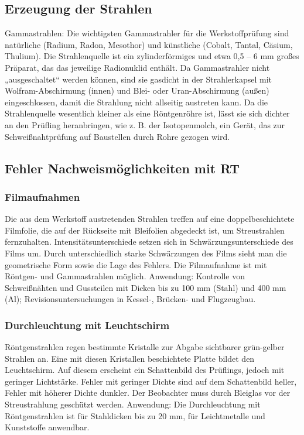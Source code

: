 \subsection{Erzeugung der Strahlen}
Gammastrahlen: Die wichtigsten Gammastrahler für die Werkstoffprüfung sind natürliche (Radium, Radon, Mesothor) und künstliche (Cobalt, Tantal, Cäsium, Thulium). Die Strahlenquelle ist ein zylinderförmiges und etwa 0,5 – 6 mm großes Präparat, das das jeweilige Radionuklid enthält. Da Gammastrahler nicht „ausgeschaltet“ werden können, sind sie gasdicht in der Strahlerkapsel mit Wolfram-Abschirmung (innen) und Blei- oder Uran-Abschirmung (außen) eingeschlossen, damit die Strahlung nicht allseitig austreten kann. Da die Strahlenquelle wesentlich kleiner als eine Röntgenröhre ist, lässt sie sich dichter an den Prüfling heranbringen, wie z. B. der Isotopenmolch, ein Gerät, das zur Schweißnahtprüfung auf Baustellen durch Rohre gezogen wird.
\\
\subsection{Fehler Nachweismöglichkeiten mit RT}

\subsubsection{Filmaufnahmen}
Die aus dem Werkstoff austretenden Strahlen treffen auf eine doppelbeschichtete Filmfolie, die auf der Rückseite mit Bleifolien abgedeckt ist, um Streustrahlen fernzuhalten. Intensitätsunterschiede setzen sich in Schwärzungsunterschiede des Films um. Durch unterschiedlich starke Schwärzungen des Films sieht man die geometrische Form sowie die Lage des Fehlers. Die Filmaufnahme ist mit Röntgen- und Gammastrahlen möglich.
Anwendung: Kontrolle von Schweißnähten und Gussteilen mit Dicken bis zu 100 mm (Stahl) und 400 mm (Al); Revisionsuntersuchungen in Kessel-, Brücken- und Flugzeugbau.\\
\subsubsection{Durchleuchtung mit Leuchtschirm}
Röntgenstrahlen regen bestimmte Kristalle zur Abgabe sichtbarer grün-gelber Strahlen an. Eine mit diesen Kristallen beschichtete Platte bildet den Leuchtschirm. Auf diesem erscheint ein Schattenbild des Prüflings, jedoch mit geringer Lichtstärke. Fehler mit geringer Dichte sind auf dem Schattenbild heller, Fehler mit höherer Dichte dunkler. Der Beobachter muss durch Bleiglas vor der Streustrahlung geschützt werden.
Anwendung: Die Durchleuchtung mit Röntgenstrahlen ist für Stahldicken bis zu 20 mm, für Leichtmetalle und Kunststoffe anwendbar.\\
